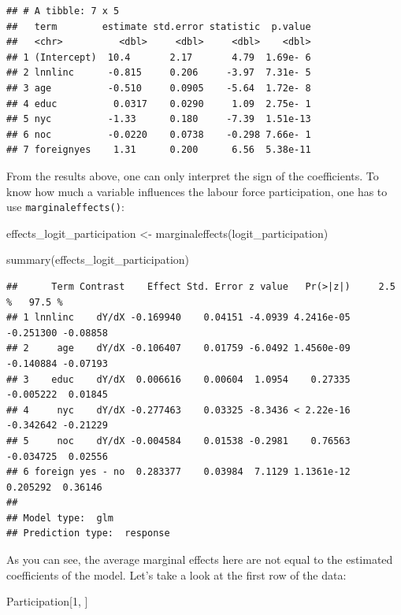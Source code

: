 \documentclass[
]{article}
\newenvironment{Shaded}{\begin{snugshade}}{\end{snugshade}}
\newcommand{\DecValTok}[1]{\textcolor[rgb]{0.00,0.00,0.81}{#1}}
\newcommand{\FunctionTok}[1]{\textcolor[rgb]{0.00,0.00,0.00}{#1}}
\newcommand{\NormalTok}[1]{#1}
\newcommand{\OtherTok}[1]{\textcolor[rgb]{0.56,0.35,0.01}{#1}}
\begin{document}
\begin{verbatim}
## # A tibble: 7 x 5
##   term        estimate std.error statistic  p.value
##   <chr>          <dbl>     <dbl>     <dbl>    <dbl>
## 1 (Intercept)  10.4       2.17       4.79  1.69e- 6
## 2 lnnlinc      -0.815     0.206     -3.97  7.31e- 5
## 3 age          -0.510     0.0905    -5.64  1.72e- 8
## 4 educ          0.0317    0.0290     1.09  2.75e- 1
## 5 nyc          -1.33      0.180     -7.39  1.51e-13
## 6 noc          -0.0220    0.0738    -0.298 7.66e- 1
## 7 foreignyes    1.31      0.200      6.56  5.38e-11
\end{verbatim}

From the results above, one can only interpret the sign of the coefficients. To know how much a
variable influences the labour force participation, one has to use \texttt{marginaleffects()}:

\begin{Shaded}
\begin{Highlighting}[]
\NormalTok{effects\_logit\_participation }\OtherTok{\textless{}{-}} \FunctionTok{marginaleffects}\NormalTok{(logit\_participation)}

\FunctionTok{summary}\NormalTok{(effects\_logit\_participation)}
\end{Highlighting}
\end{Shaded}

\begin{verbatim}
##      Term Contrast    Effect Std. Error z value   Pr(>|z|)     2.5 %   97.5 %
## 1 lnnlinc    dY/dX -0.169940    0.04151 -4.0939 4.2416e-05 -0.251300 -0.08858
## 2     age    dY/dX -0.106407    0.01759 -6.0492 1.4560e-09 -0.140884 -0.07193
## 3    educ    dY/dX  0.006616    0.00604  1.0954    0.27335 -0.005222  0.01845
## 4     nyc    dY/dX -0.277463    0.03325 -8.3436 < 2.22e-16 -0.342642 -0.21229
## 5     noc    dY/dX -0.004584    0.01538 -0.2981    0.76563 -0.034725  0.02556
## 6 foreign yes - no  0.283377    0.03984  7.1129 1.1361e-12  0.205292  0.36146
## 
## Model type:  glm 
## Prediction type:  response
\end{verbatim}

As you can see, the average marginal effects here are not equal to the estimated coefficients of the
model. Let's take a look at the first row of the data:

\begin{Shaded}
\begin{Highlighting}[]
\NormalTok{Participation[}\DecValTok{1}\NormalTok{, ]}
\end{Highlighting}
\end{Shaded}
\end{document}
